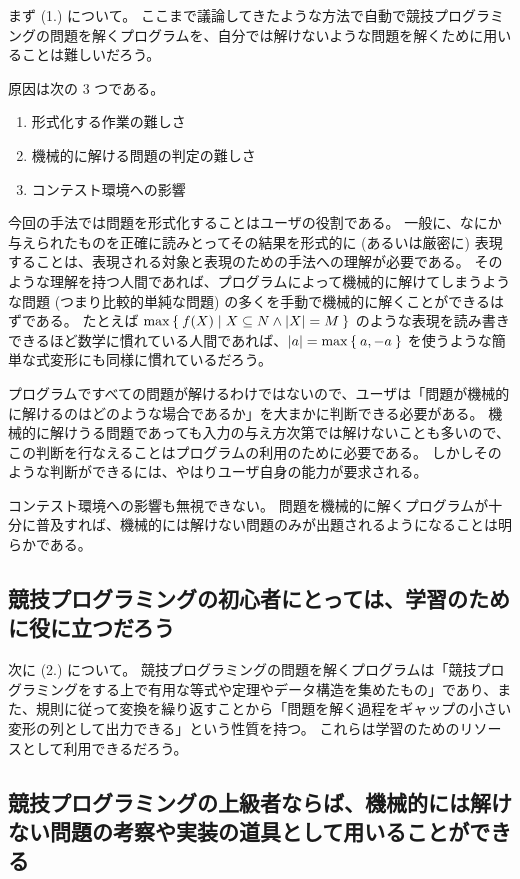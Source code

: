 \documentclass{ltjsarticle}
\begin{document}
まず (1.) について。
ここまで議論してきたような方法で自動で競技プログラミングの問題を解くプログラムを、自分では解けないような問題を解くために用いることは難しいだろう。

原因は次の $3$ つである。

\begin{enumerate}[label=(\alph{enumi}.)]
    \item 形式化する作業の難しさ
    \item 機械的に解ける問題の判定の難しさ
    \item コンテスト環境への影響
\end{enumerate}

今回の手法では問題を形式化することはユーザの役割である。
一般に、なにか与えられたものを正確に読みとってその結果を形式的に (あるいは厳密に) 表現することは、表現される対象と表現のための手法への理解が必要である。
そのような理解を持つ人間であれば、プログラムによって機械的に解けてしまうような問題 (つまり比較的単純な問題) の多くを手動で機械的に解くことができるはずである。
たとえば $\max \Set{ f(X) | X \subseteq N \land \lvert X \rvert = M }$ のような表現を読み書きできるほど数学に慣れている人間であれば、$\lvert a \rvert = \max \Set{ a, -a }$ を使うような簡単な式変形にも同様に慣れているだろう。

プログラムですべての問題が解けるわけではないので、ユーザは「問題が機械的に解けるのはどのような場合であるか」を大まかに判断できる必要がある。
機械的に解けうる問題であっても入力の与え方次第では解けないことも多いので、この判断を行なえることはプログラムの利用のために必要である。
しかしそのような判断ができるには、やはりユーザ自身の能力が要求される。

コンテスト環境への影響も無視できない。
問題を機械的に解くプログラムが十分に普及すれば、機械的には解けない問題のみが出題されるようになることは明らかである。

\subsection{競技プログラミングの初心者にとっては、学習のために役に立つだろう}

次に (2.) について。
競技プログラミングの問題を解くプログラムは「競技プログラミングをする上で有用な等式や定理やデータ構造を集めたもの」であり、また、規則に従って変換を繰り返すことから「問題を解く過程をギャップの小さい変形の列として出力できる」という性質を持つ。
これらは学習のためのリソースとして利用できるだろう。

\subsection{競技プログラミングの上級者ならば、機械的には解けない問題の考察や実装の道具として用いることができる}
\end{document}

